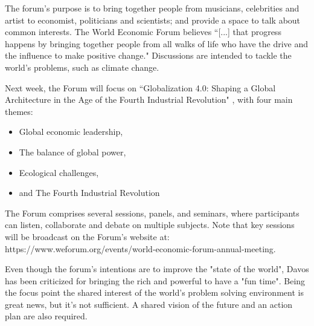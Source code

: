 \documentclass[11pt,a4paper]{article}
\begin{document}
The forum's purpose is to bring together people from musicians, celebrities and artist to economist, politicians and scientists; and provide a space to talk about common interests. The World Economic Forum believes ``[...] that progress happens by bringing together people from all walks of life who have the drive and the influence to make positive change." \parencite{WEF2019} Discussions are intended to tackle the world's problems, such as climate change.

Next week, the Forum will focus on ``Globalization 4.0: Shaping a Global Architecture in the Age of the Fourth Industrial Revolution" \parencite{WEF2019a}, with four main themes:
\begin{itemize}
\item Global economic leadership,
\item The balance of global power,
\item Ecological challenges,
\item and The Fourth Industrial Revolution
\end{itemize}

The Forum comprises several sessions, panels, and seminars, where participants can listen, collaborate and debate on multiple subjects. Note that key sessions will be broadcast on the Forum's website at: https://www.weforum.org/events/world-economic-forum-annual-meeting.

Even though the forum's intentions are to improve the "state of the world", Davos has been criticized for bringing the rich and powerful to have a "fun time". Being the focus point the shared interest of the world's problem solving environment is great news, but it's not sufficient. A shared vision of the future and an action plan are also required. \parencite{Ellyatt2018}



\clearpage
\printbibliography

\end{document}
